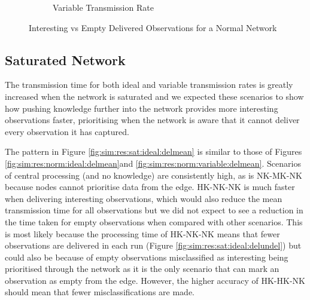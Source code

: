 \begin{figure}[H]
\begin{subfigure}{.5\textwidth}
  \caption{Variable Transmission Rate}
	\label{fig:sim:res:norm:variable:emptint}
\end{subfigure}
\caption{Interesting vs Empty Delivered Observations for a Normal Network}
\end{figure}

\subsection{Saturated Network}
The transmission time for both ideal and variable transmission rates is greatly increased when the network is saturated and we expected these scenarios to show how pushing knowledge further into the network provides more interesting observations faster, prioritising when the network is aware that it cannot deliver every observation it has captured.

	The pattern in Figure \ref{fig:sim:res:sat:ideal:delmean} is similar to those of Figures \ref{fig:sim:res:norm:ideal:delmean}and \ref{fig:sim:res:norm:variable:delmean}. Scenarios of central processing (and no knowledge) are consistently high, as is NK-MK-NK because nodes cannot prioritise data from the edge. HK-NK-NK is much faster when delivering interesting observations, which would also reduce the mean transmission time for all observations but we did not expect to see a reduction in the time taken for empty observations when compared with other scenarios. This is most likely because the processing time of HK-NK-NK means that fewer observations are delivered in each run (Figure \ref{fig:sim:res:sat:ideal:delundel}) but could also be because of empty observations misclassified as interesting being prioritised through the network as it is the only scenario that can mark an observation as empty from the edge. However, the higher accuracy of HK-HK-NK should mean that fewer misclassifications are made. 
	
